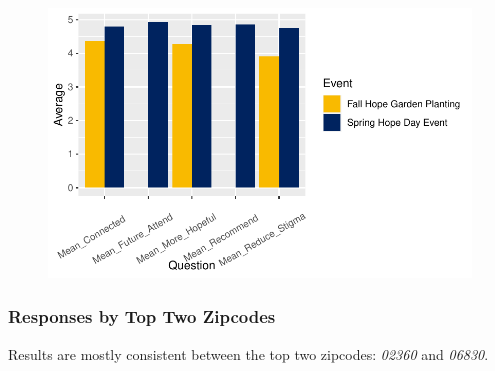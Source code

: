 \documentclass[
  letterpaper,
  DIV=11,
  numbers=noendperiod]{scrartcl}
\begin{document}
\begin{figure}[H]

{\centering \includegraphics{ytp_post_event_survey_files/figure-pdf/unnamed-chunk-14-1.pdf}

}

\end{figure}

\hypertarget{responses-by-top-two-zipcodes}{%
\subsubsection{Responses by Top Two
Zipcodes}\label{responses-by-top-two-zipcodes}}

Results are mostly consistent between the top two zipcodes: \emph{02360}
and \emph{06830}.
\end{document}

